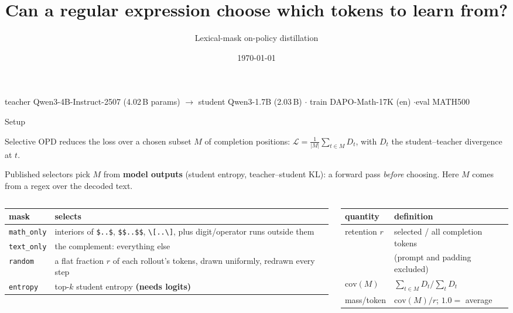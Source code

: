 \documentclass[aspectratio=169,11pt]{beamer}
\title{\textbf{Can a regular expression choose which tokens to learn from?}}
\subtitle{Lexical-mask on-policy distillation}
\author{}
\date{\small\today}
\newcommand{\dn}[1]{\textcolor{bad}{\textbf{#1}}}
\newcommand{\aside}[1]{{\footnotesize\textcolor{mut}{#1}}}
\begin{document}
\begin{frame}[plain]
  \titlepage
  \vspace{-1.5em}
  \begin{center}\aside{teacher Qwen3-4B-Instruct-2507 (4.02\,B params) $\rightarrow$
  student Qwen3-1.7B (2.03\,B) \quad$\cdot$\quad
  train DAPO-Math-17K (en) \quad$\cdot$\quad eval MATH500}\end{center}
\end{frame}

\begin{frame}{Setup}

Selective OPD reduces the loss over a chosen subset $M$ of completion positions:
$\mathcal{L}=\frac{1}{|M|}\sum_{t\in M} D_t$, with $D_t$ the student--teacher divergence at $t$.

\medskip
Published selectors pick $M$ from \textbf{model outputs} (student entropy, teacher--student KL):
a forward pass \emph{before} choosing. Here $M$ comes from a regex over the decoded text.

\vspace{0.6em}
\begin{columns}[T]
\begin{column}{0.5\textwidth}
{\footnotesize
\begin{tabular}{@{}l>{\raggedright\arraybackslash}p{4.4cm}@{}}
\toprule
\textbf{mask} & \textbf{selects} \\
\midrule
\texttt{math\_only} & interiors of \texttt{\$..\$}, \texttt{\$\$..\$\$}, \texttt{\textbackslash[..\textbackslash]}, plus digit/operator runs outside them \\
\texttt{text\_only} & the complement: everything else \\
\midrule
\texttt{random}  & a flat fraction $r$ of each rollout's tokens, drawn uniformly, redrawn every step \\
\texttt{entropy} & top-$k$ student entropy \dn{(needs logits)} \\
\bottomrule
\end{tabular}}
\end{column}
\begin{column}{0.5\textwidth}
{\footnotesize
\begin{tabular}{@{}ll@{}}
\toprule
\textbf{quantity} & \textbf{definition} \\
\midrule
retention $r$ & selected / all completion tokens \\
 & (prompt and padding excluded) \\
$\mathrm{cov}(M)$ & $\sum_{t\in M}D_t \big/ \sum_t D_t$ \\
mass/token & $\mathrm{cov}(M)/r$; \; $1.0=$ average \\
\bottomrule
\end{tabular}}


\end{column}
\end{columns}
\end{frame}
\end{document}
